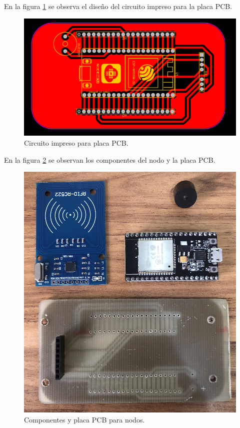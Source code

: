 En la figura \ref{fig:hwlayout} se observa el diseño del circuito impreso para la placa PCB. 

\begin{figure}[H]
	\centering
	\includegraphics[scale=.35]{./Figures/hardware/layout.png}
	\caption{Circuito impreso para placa PCB.}
	\label{fig:hwlayout}
\end{figure}  

En la figura \ref{fig:hwnodo} se observan los componentes del nodo y la placa PCB.

\begin{figure}[H]
	\centering
	\includegraphics[scale=.40]{./Figures/hardware/nodo.png}
	\caption{Componentes y placa PCB para nodos.}
	\label{fig:hwnodo}
\end{figure}



